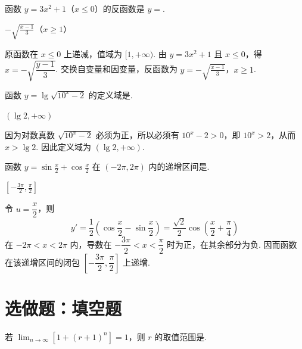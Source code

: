 \documentclass[UTF8,a4paper,oneside,11pt]{ctexbook}
\begin{document}
\begin{problem}
函数 \(y=3x^2+1\)（\(x\leqslant 0\)）的反函数是 \(y=\)\fillinblank{}.
\end{problem}

\begin{answer}
\(-\sqrt{\frac{x-1}{3}}\)（\(x\geqslant1\)）
\end{answer}

\begin{solution}
原函数在 \(x\leqslant0\) 上递减，值域为 \([1,+\infty)\). 由 \(y=3x^2+1\) 且 \(x\leqslant0\)，得 \(x=-\sqrt{\dfrac{y-1}{3}}\). 交换自变量和因变量，反函数为
\(y=-\sqrt{\frac{x-1}{3}}\)，\(x\geqslant1\).
\end{solution}

\begin{problem}
函数 \(y=\lg\sqrt{10^{x}-2} \) 的定义域是\fillinblank{}.
\end{problem}

\begin{answer}
\((\lg2,+\infty)\)
\end{answer}

\begin{solution}
因为对数真数 \(\sqrt{10^x-2}\) 必须为正，所以必须有 \(10^x-2>0\)，即 \(10^x>2\)，从而 \(x>\lg2\). 因此定义域为 \((\lg2,+\infty)\).
\end{solution}

\begin{problem}
函数 \(y=\sin\frac{x}{2}+\cos\frac{x}{2} \) 在 \((-2\pi,2\pi) \) 内的递增区间是\fillinblank{}.
\end{problem}

\begin{answer}
\(\left[-\frac{3\pi}{2},\frac{\pi}{2}\right]\)
\end{answer}

\begin{solution}
令 \(u=\dfrac{x}{2}\)，则
\[
y'=\frac12\left(\cos\frac{x}{2}-\sin\frac{x}{2}\right)=\frac{\sqrt2}{2}\cos\left(\frac{x}{2}+\frac{\pi}{4}\right)
\]
在 \(-2\pi<x<2\pi\) 内，导数在 \(-\dfrac{3\pi}{2}<x<\dfrac{\pi}{2}\) 时为正，在其余部分为负. 因而函数在该递增区间的闭包 \(\left[-\dfrac{3\pi}{2},\dfrac{\pi}{2}\right]\) 上递增.
\end{solution}

\section{选做题：填空题}

\begin{problem}[A]
若 \(\displaystyle\lim_{n\to\infty}\left[1+(r+1)^n\right]=1\)，则 \(r\) 的取值范围是\fillinblank{}.
\end{problem}
\end{document}
